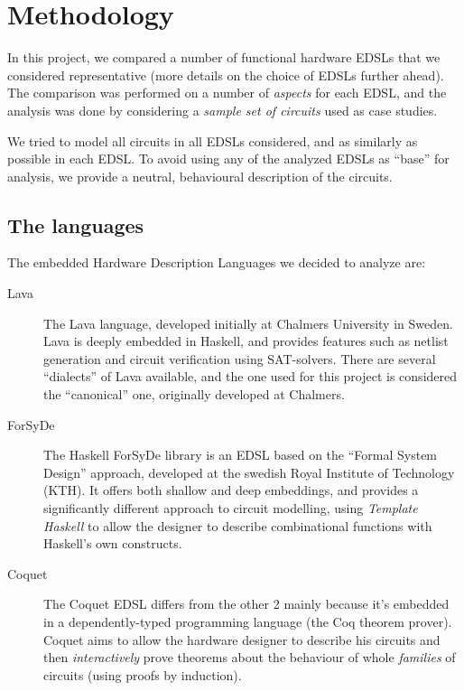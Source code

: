 \documentclass[a4paper]{article}
\begin{document}
    \section{Methodology}
    \label{sec:methods}
        In this project, we compared a number of functional hardware EDSLs that we considered
        representative (more details on the choice of EDSLs further ahead). The comparison was
        performed on a number of \emph{aspects} for each EDSL, and the analysis was done by
        considering a \emph{sample set of circuits} used as case studies.

        We tried to model all circuits in all EDSLs considered, and as similarly as possible in each
        EDSL. To avoid using any of the analyzed EDSLs as ``base'' for analysis, we provide a
        neutral, behavioural description of the circuits.

        \subsection{The languages}
        \label{subsec:languages}
            The embedded Hardware Description Languages we decided to analyze are:
            \begin{description}
                \item[Lava] The Lava\cite{lava1998} language, developed initially at Chalmers
                    University in Sweden.  Lava is deeply embedded in Haskell, and provides features
                    such as netlist generation and circuit verification using SAT-solvers. There are
                    several ``dialects'' of Lava available, and the one used for this project is
                    considered the ``canonical'' one, originally developed at Chalmers.

                \item[ForSyDe] The Haskell ForSyDe library is an EDSL based on the ``Formal System
                    Design'' approach\cite{forsyde1999}, developed at the swedish Royal Institute of
                    Technology (KTH).  It offers both shallow and deep embeddings, and provides a
                    significantly different approach to circuit modelling, using \emph{Template
                        Haskell} to allow the designer to describe combinational functions with
                    Haskell's own constructs.

                \item[Coquet] The Coquet\cite{coquet2011} EDSL differs from the other 2 mainly
                    because it's embedded in a dependently-typed programming language (the Coq theorem
                    prover). Coquet aims to allow the hardware designer to describe his circuits and
                    then \emph{interactively} prove theorems about the behaviour of whole
                    \emph{families} of circuits (using proofs by induction).
            \end{description}
\end{document}
